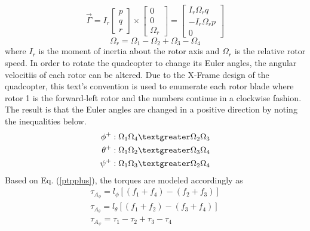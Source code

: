 \begin{equation}
\overrightarrow{\Gamma} = I_{r}\begin{bmatrix}
p \\ q \\ r
\end{bmatrix}\times\begin{bmatrix}
0 \\ 0\\ \Omega_{r}
\end{bmatrix} = \begin{bmatrix}
I_{r}\Omega_{r}q \\ -I_{r}\Omega_{r}p \\ 0
\end{bmatrix}
\label{Gamma}
\end{equation}
\begin{equation}
\Omega_{r} = \Omega_{1} - \Omega_{2} + \Omega_{3} - \Omega_{4} 
\label{Omegarel}
\end{equation}
where $I_{r}$ is the moment of inertia about the rotor axis and $\Omega_{r}$ is the relative rotor speed. In order to rotate the quadcopter to change its Euler angles, the angular velocitiis of each rotor can be altered. Due to the X-Frame design of the quadcopter, this text's convention is used to enumerate each rotor blade where rotor 1 is the forward-left rotor and the numbers continue in a clockwise fashion. The result is that the Euler angles are changed in a positive direction by noting the inequalities below.
\begin{equation}
\begin{split}
{\phi}^{+}: \Omega_{1}\Omega_{4} \textgreater \Omega_{2}\Omega_{3}\\
{\theta}^{+}: \Omega_{1}\Omega_{2} \textgreater \Omega_{3}\Omega_{4}\\
{\psi}^{+}: \Omega_{1}\Omega_{3} \textgreater \Omega_{2}\Omega_{4}
\label{ptpplus}
\end{split}
\end{equation}
Based on Eq. (\ref{ptpplus}), the torques are modeled accordingly as 
\begin{equation}
\begin{split}
\tau_{A_{\phi}} = l_{\phi}[(f_{1}+f_{4})-(f_{2}+f_{3})]\\
\tau_{A_{\theta}} = l_{\theta}[(f_{1}+f_{2})-(f_{3}+f_{4})]\\
\tau_{A_{\psi}} = \tau_{1}-\tau_{2}+\tau_{3}-\tau_{4}
\label{tauptp}
\end{split}
\end{equation}
